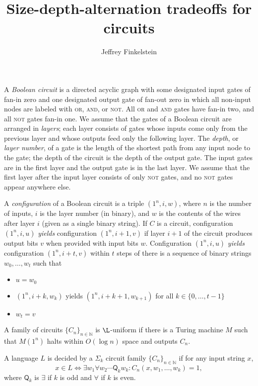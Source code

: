 \documentclass{article}
\title{Size-depth-alternation tradeoffs for circuits}
\author{Jeffrey Finkelstein}
\newcommand{\Q}{\mathsf{Q}}
\begin{document}
\maketitle

A \emph{Boolean circuit} is a directed acyclic graph with some designated input gates of fan-in zero and one designated output gate of fan-out zero in which all non-input nodes are labeled with \textsc{or}, \textsc{and}, or \textsc{not}.
All \textsc{or} and \textsc{and} gates have fan-in two, and all \textsc{not} gates fan-in one.
We assume that the gates of a Boolean circuit are arranged in \emph{layers}; each layer consists of gates whose inputs come only from the previous layer and whose outputs feed only the following layer.
The \emph{depth}, or \emph{layer number}, of a gate is the length of the shortest path from any input node to the gate; the depth of the circuit is the depth of the output gate.
The input gates are in the first layer and the output gate is in the last layer.
We assume that the first layer after the input layer consists of only \textsc{not} gates, and no \textsc{not} gates appear anywhere else.

A \emph{configuration} of a Boolean circuit is a triple $(1^n, i, w)$, where $n$ is the number of inputs, $i$ is the layer number (in binary), and $w$ is the contents of the wires after layer $i$ (given as a single binary string).
If $C$ is a circuit, configuration $(1^n, i, u)$ \emph{yields} configuration $(1^n, i + 1, v)$ if layer $i + 1$ of the circuit produces output bits $v$ when provided with input bits $w$.
Configuration $(1^n, i, u)$ \emph{yields} configuration $(1^n, i + t, v)$ within $t$ steps of there is a sequence of binary strings $w_0, \dotsc, w_t$ such that
\begin{itemize}
\item $u = w_0$
\item $(1^n, i + k, w_k)$ yields $(1^n, i + k + 1, w_{k + 1})$ for all $k \in \{0, \dotsc, t - 1\}$
\item $w_t = v$
\end{itemize}

A family of circuits $\{C_n\}_{n \in \mathbb{N}}$ is $\L$-uniform if there is a Turing machine $M$ such that $M(1^n)$ halts within $O(\log n)$ space and outputs $C_n$.

\begin{definition}
  A language $L$ is decided by a $\Sigma_k$ circuit family $\{C_n\}_{n \in \mathbb{N}}$ if for any input string $x$,
  \begin{equation*}
    x \in L \iff \exists w_1 \forall w_2 \dotsb \Q_k w_k \colon C_n(x, w_1, \dotsc, w_k) = 1,
  \end{equation*}
  where $\Q_k$ is $\exists$ if $k$ is odd and $\forall$ if $k$ is even.
\end{definition}
\end{document}
